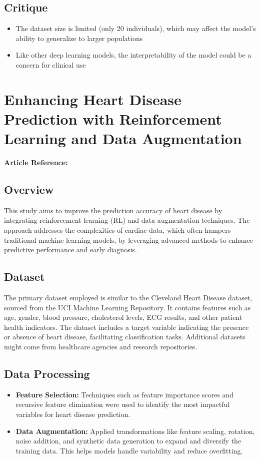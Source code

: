 \subsection*{Critique}
\begin{itemize}
    \item The dataset size is limited (only 20 individuals), which may affect the model's ability to generalize to larger populations
    \item Like other deep learning models, the interpretability of the model could be a concern for clinical use
\end{itemize}

\section{Enhancing Heart Disease Prediction with Reinforcement Learning and Data Augmentation}
\textbf{Article Reference:} \cite{article_5}

\subsection*{Overview}
This study aims to improve the prediction accuracy of heart disease by integrating reinforcement learning (RL) and data augmentation techniques. The approach addresses the complexities of cardiac data, which often hampers traditional machine learning models, by leveraging advanced methods to enhance predictive performance and early diagnosis.

\subsection*{Dataset}
The primary dataset employed is similar to the Cleveland Heart Disease dataset, sourced from the UCI Machine Learning Repository. It contains features such as age, gender, blood pressure, cholesterol levels, ECG results, and other patient health indicators. The dataset includes a target variable indicating the presence or absence of heart disease, facilitating classification tasks. Additional datasets might come from healthcare agencies and research repositories.

\subsection*{Data Processing}
\begin{itemize}
    \item \textbf{Feature Selection:} Techniques such as feature importance scores and recursive feature elimination were used to identify the most impactful variables for heart disease prediction.
    \item \textbf{Data Augmentation:} Applied transformations like feature scaling, rotation, noise addition, and synthetic data generation to expand and diversify the training data. This helps models handle variability and reduce overfitting.
\end{itemize}

